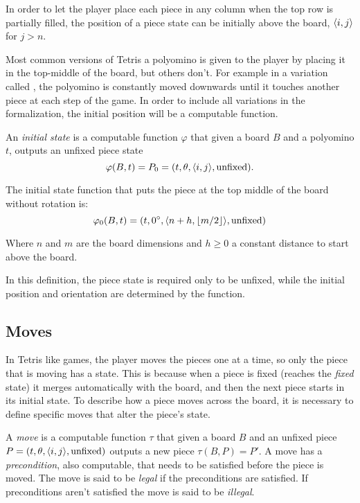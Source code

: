 In order to let the player place each piece in any column when the top row is partially filled, the position of a piece state can be initially above the board, $\cell$ for $j > n$.

\vspace{1em}

Most common versions of Tetris a polyomino is given to the player by placing it in the top-middle of the board, but others don't. For example in a variation called \cite{CTV}, the polyomino is constantly moved downwards until it touches another piece at each step of the game. In order to include all variations in the formalization, the initial position will be a computable function.

\begin{definition} 
  An \emph{initial state} is a computable function $\varphi$ that given a board $B$ and a polyomino $t$, outputs an unfixed piece state $$\varphi(B,t) = P_0 = \piece[t][\theta][i][j][\text{unfixed}].$$
\end{definition}

\begin{example} The initial state function that puts the piece at the top middle of the board without rotation is:
$$\varphi_0(B,t) = \piece[t][0^\circ][n + h][\lfloor m / 2 \rfloor][\text{unfixed}]$$

Where $n$ and $m$ are the board dimensions and $h \geq 0$ a constant distance to start above the board.

\end{example}

In this definition, the piece state is required only to be unfixed, while the initial position and orientation are determined by the function.  

\subsection{Moves}

In Tetris like games, the player moves the pieces one at a time, so only the piece that is moving has a state. This is because when a piece is fixed (reaches the \emph{fixed} state) it merges automatically with the board, and then the next piece starts in its initial state. To describe how a piece moves across the board, it is necessary to define specific moves that alter the piece's state.  

\begin{definition} 
  A \emph{move} is a computable function $\tau$ that given a board $B$ and an unfixed piece $P = \piece[t][\theta][i][j][\text{unfixed}]$ outputs a new piece $\tau(B, P) = P'$. A move has a \emph{precondition}, also computable, that needs to be satisfied before the piece is moved. The move is said to be \emph{legal} if the preconditions are satisfied. If preconditions aren't satisfied the move is said to be \emph{illegal}.
\end{definition}

